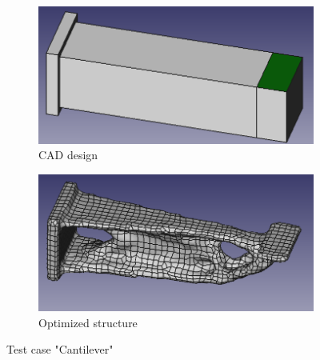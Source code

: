 \begin{figure}[H]
\begin{center}
\begin{subfigure}[t]{.49\textwidth}
\begin{center}
\includegraphics[width=.9\textwidth]{Pictures/Results/CantiIn.png}
\end{center}
\caption{CAD design}
\label{fig:cantiCAD}
\end{subfigure}\hfill
\begin{subfigure}[t]{.49\textwidth}
\begin{center}
\includegraphics[width=.9\textwidth]{Pictures/Results/CantiOut.png}
\end{center}
\caption{Optimized structure}
\label{fig:cantiOPTIM}
\end{subfigure}
\caption{Test case "Cantilever"}
\end{center}
\end{figure}
\newpage



